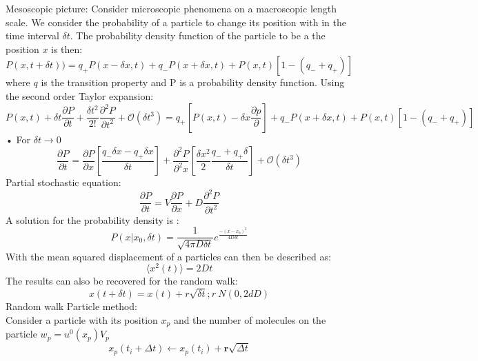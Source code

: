 \documentclass[hyperref]{labbook}
\numberwithin{equation}{experiment}
\numberwithin{table}{experiment}
\numberwithin{figure}{experiment}
\begin{document}
Mesoscopic picture: Consider microscopic phenomena on a macroscopic length scale. We consider the probability of a particle to change its position with in the time interval $\delta t$. The probability density function of the particle to be a the position $x$ is then: 
\begin{equation}
P(x,t+\delta t ) )  = q_{+} P(x-\delta x , t) + q_{-} P(x+\delta x , t)+P(x,t)[1-(q_{-}+q_{+}  )]
\end{equation}
where $q$ is the transition property and P is a probability density function. Using the second order Taylor expansion:
\begin{equation}
 P(x,t) + \delta t \frac{\partial P }{\partial t} +\frac{ \delta t ^2 }{2!} \frac{\partial^2 P}{\partial t ^2} + \mathcal{O}(\delta t ^3) =  q_{+} \left[  P(x , t)  - \delta x  \frac{\partial p}{\partial }    \right]+ q_{-} P(x+\delta x , t)+P(x,t)[1-(q_{-}+q_{+}  )] 
\end{equation}•
For $\delta t \rightarrow 0$
\begin{equation}
\frac{\partial P}{\partial t} = \frac{\partial P}{\partial x} \left [ \frac{q_{-}  \delta x - q_{+} \delta x  }{\delta t } \right] + \frac{\partial ^2P}{\partial^2x} \left [ \frac{\delta x^2}{2}\frac{q_{-}  + q_{+} \delta  }{\delta t } \right]+\mathcal{O}(\delta t ^3)
\end{equation}
Partial stochastic equation: 
\begin{equation}
\frac{\partial P}{\partial t } = V \frac{\partial P}{\partial x }  +D \frac{\partial^2 P}{\partial t^2 } 
\end{equation}
A solution for the probability density is : 
\begin{equation}
P(x|x_0, \delta t ) = \frac{1}{\sqrt{4\pi D \delta t}}e^{\frac{-(x-x_0)^2}{4D\delta t}}
\end{equation}
With the mean squared displacement of a particles can then be described as: 
\begin{equation}
\langle x^2(t) \rangle = 2Dt 
\end{equation}
The results can also be recovered for the random walk: 
\begin{equation}
x(t + \delta t ) = x(t) + r \sqrt{\delta t} ; r ~ N(0,2dD)
\end{equation}
Random walk Particle method: \\
Consider a particle with its position $x_p$ and the number of molecules on the particle $w_p = u^0(x_p) V_p $
\begin{equation}
x_p (t_i+ \Delta t ) \leftarrow x_p(t_i) + \mathbf{r} \sqrt{\Delta t}
\end{equation}
\end{document}
